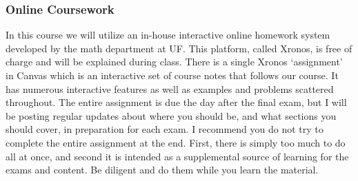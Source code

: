 \documentclass{ximera}
\begin{document}
    \subsubsection*{Online Coursework}
    In this course we will utilize an in-house interactive online homework system developed by the math department at UF. This platform, called Xronos, is free of charge and will be explained during class. There is a single Xronos `assignment' in Canvas which is an interactive set of course notes that follows our course. It has numerous interactive features as well as examples and problems scattered throughout. The entire assignment is due the day after the final exam, but I will be posting regular updates about where you should be, and what sections you should cover, in preparation for each exam. I recommend you do  not try to complete the entire assignment at the end. First, there is simply too much to do all at once, and second it is intended as a supplemental source of learning for the exams and content. Be diligent and do them while you learn the material.\\
    
\end{document}
